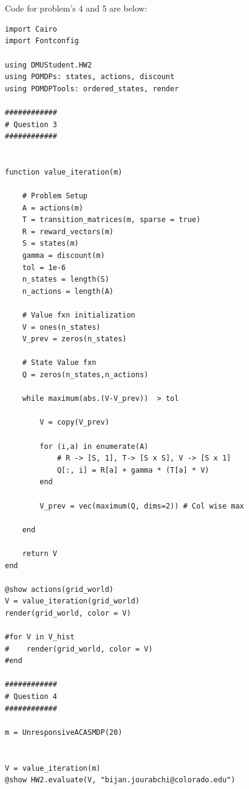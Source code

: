 \documentclass[11pt]{article}
\begin{document}
\section{}

Code for problem's 4 and 5 are below:



\begin{lstlisting}
import Cairo
import Fontconfig

using DMUStudent.HW2
using POMDPs: states, actions, discount
using POMDPTools: ordered_states, render

############
# Question 3
############


function value_iteration(m)

    # Problem Setup
    A = actions(m)
    T = transition_matrices(m, sparse = true)
    R = reward_vectors(m)
    S = states(m)
    gamma = discount(m)
    tol = 1e-6
    n_states = length(S)
    n_actions = length(A) 

    # Value fxn initialization
    V = ones(n_states)
    V_prev = zeros(n_states)

    # State Value fxn
    Q = zeros(n_states,n_actions)

    while maximum(abs.(V-V_prev))  > tol

        V = copy(V_prev)

        for (i,a) in enumerate(A)
            # R -> [S, 1], T-> [S x S], V -> [S x 1]
            Q[:, i] = R[a] + gamma * (T[a] * V)
        end

        V_prev = vec(maximum(Q, dims=2)) # Col wise max
 
    end

    return V
end

@show actions(grid_world) 
V = value_iteration(grid_world)
render(grid_world, color = V)

#for V in V_hist
#    render(grid_world, color = V)
#end

############
# Question 4
############

m = UnresponsiveACASMDP(20)


V = value_iteration(m)
@show HW2.evaluate(V, "bijan.jourabchi@colorado.edu")
\end{lstlisting}
\end{document}
